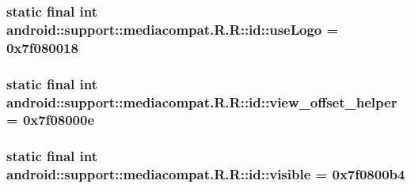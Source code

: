 \hypertarget{classandroid_1_1support_1_1mediacompat_1_1_r_1_1id_2297ad8bf733209dc24893507456e314}{
\subsubsection[{useLogo}]{\setlength{\rightskip}{0pt plus 5cm}static final int android::support::mediacompat.R.R::id::useLogo = 0x7f080018}}
\label{classandroid_1_1support_1_1mediacompat_1_1_r_1_1id_2297ad8bf733209dc24893507456e314}


\hypertarget{classandroid_1_1support_1_1mediacompat_1_1_r_1_1id_733cf39731ce6dc8643402295372cbdb}{
\subsubsection[{view\_\-offset\_\-helper}]{\setlength{\rightskip}{0pt plus 5cm}static final int android::support::mediacompat.R.R::id::view\_\-offset\_\-helper = 0x7f08000e}}
\label{classandroid_1_1support_1_1mediacompat_1_1_r_1_1id_733cf39731ce6dc8643402295372cbdb}


\hypertarget{classandroid_1_1support_1_1mediacompat_1_1_r_1_1id_d435b817969d69379b1d42620779f126}{
\subsubsection[{visible}]{\setlength{\rightskip}{0pt plus 5cm}static final int android::support::mediacompat.R.R::id::visible = 0x7f0800b4}}
\label{classandroid_1_1support_1_1mediacompat_1_1_r_1_1id_d435b817969d69379b1d42620779f126}


